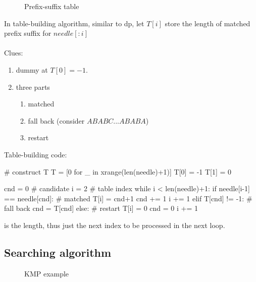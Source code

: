 \begin{figure}[hbtp]
\centering
{}
\caption{Prefix-suffix table}
\label{fig:kmp_table}
\end{figure}
In table-building algorithm, similar to dp, let $T[i]$ store the length of matched prefix suffix for $needle[:i]$\\
\\
Clues:
\begin{enumerate}
\item dummy at $T[0]=-1$.
\item three parts
\begin{enumerate}
\item matched
\item fall back (consider $ABABC...ABABA$)
\item restart 
\end{enumerate}
\end{enumerate}
Table-building code:
\begin{python}
# construct T
T = [0 for _ in xrange(len(needle)+1)]
T[0] = -1
T[1] = 0

cnd = 0  # candidate 
i = 2  # table index
while i < len(needle)+1:
    if needle[i-1] == needle[cnd]:  # matched
        T[i] = cnd+1
        cnd += 1
        i += 1
    elif T[cnd] != -1:  # fall back 
        cnd = T[cnd]
    else:  # restart 
        T[i] = 0
        cnd = 0
        i += 1
\end{python}

 is the length, thus just the next index to be processed in the next loop. 
\subsection{Searching algorithm}
\begin{figure}[F]
\centering
{}
\caption{KMP example}
\label{fig:kmp_presuffix}
\end{figure}

